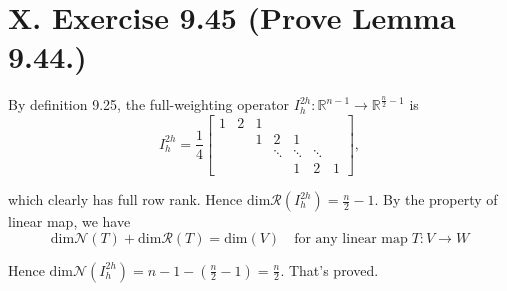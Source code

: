 \documentclass[twoside,a4paper]{article}
\begin{document}
\section*{X. Exercise 9.45 (Prove Lemma 9.44.)}
\;\;\;\;\;\;By definition 9.25, the full-weighting operator $I_h^{2h}:\mathbb{R}^{n-1}\to\mathbb{R}^{\frac{n}{2}-1}$ is
\begin{equation*}
    I_h^{2h}=\frac{1}{4}\begin{bmatrix}
        1 & 2 & 1\\
        & & 1 & 2 & 1 \\
        & & &  \ddots & \ddots & \ddots \\
        & & &  & 1 & 2 & 1
    \end{bmatrix},
\end{equation*}

which clearly has full row rank. Hence $\text{dim} \mathcal{R}(I_h^{2h})=\frac{n}{2}-1$. By the property of linear map, we have
\begin{equation*}
    \text{dim} \mathcal{N}(T) + \text{dim} \mathcal{R}(T) = \text{dim}(V)\quad \text{for any linear map} \;T:V\to W
\end{equation*}

Hence $\text{dim} \mathcal{N}(I_h^{2h})=n-1-\left(\frac{n}{2}-1\right)=\frac{n}{2}$. That's proved.
\end{document}
